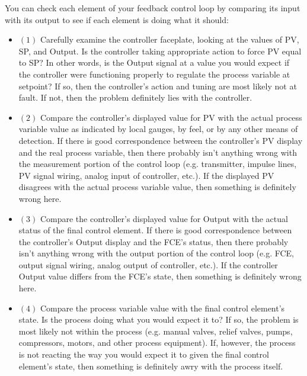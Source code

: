 \documentclass[12pt,a4paper]{article}
\begin{document}
\noindent
You can check each element of your feedback control loop by comparing its input with its output to see if each element is doing what it should:

\begin{itemize}
\item{$(1)$}  Carefully examine the controller faceplate, looking at the values of PV, SP, and Output.  Is the controller taking appropriate action to force PV equal to SP?  In other words, is the Output signal at a value you would expect if the controller were functioning properly to regulate the process variable at setpoint?  If so, then the controller's action and tuning are most likely not at fault.  If not, then the problem definitely lies with the controller.
\item{$(2)$}  Compare the controller's displayed value for PV with the actual process variable value as indicated by local gauges, by feel, or by any other means of detection.  If there is good correspondence between the controller's PV display and the real process variable, then there probably isn't anything wrong with the measurement portion of the control loop (e.g. transmitter, impulse lines, PV signal wiring, analog input of controller, etc.).  If the displayed PV disagrees with the actual process variable value, then something is definitely wrong here.
\item{$(3)$}  Compare the controller's displayed value for Output with the actual status of the final control element.  If there is good correspondence between the controller's Output display and the FCE's status, then there probably isn't anything wrong with the output portion of the control loop (e.g. FCE, output signal wiring, analog output of controller, etc.).  If the controller Output value differs from the FCE's state, then something is definitely wrong here.
\item{$(4)$}  Compare the process variable value with the final control element's state.  Is the process doing what you would expect it to?  If so, the problem is most likely not within the process (e.g. manual valves, relief valves, pumps, compressors, motors, and other process equipment).  If, however, the process is not reacting the way you would expect it to given the final control element's state, then something is definitely awry with the process itself.
\end{itemize}
\end{document}
